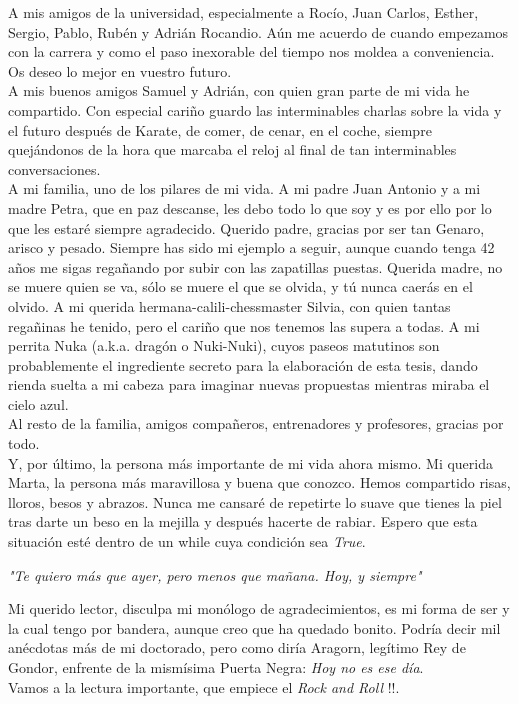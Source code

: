 A mis amigos de la universidad, especialmente a Rocío, Juan Carlos, Esther, Sergio, Pablo, Rubén y Adrián Rocandio. Aún me acuerdo de cuando empezamos con la carrera y como el paso inexorable del tiempo nos moldea a conveniencia. Os deseo lo mejor en vuestro futuro. \\

A mis buenos amigos Samuel y Adrián, con quien gran parte de mi vida he compartido. Con especial cariño guardo las interminables charlas sobre la vida y el futuro después de Karate, de comer, de cenar, en el coche, siempre quejándonos de la hora que marcaba el reloj al final de tan interminables conversaciones. \\

A mi familia, uno de los pilares de mi vida. A mi padre Juan Antonio y a mi madre Petra, que en paz descanse, les debo todo lo que soy y es por ello por lo que les estaré siempre agradecido. Querido padre, gracias por ser tan Genaro, arisco y pesado. Siempre has sido mi ejemplo a seguir, aunque cuando tenga 42 años me sigas regañando por subir con las zapatillas puestas. Querida madre, no se muere quien se va, sólo se muere el que se olvida, y tú nunca caerás en el olvido. A mi querida hermana-calili-chessmaster Silvia, con quien tantas regañinas he tenido, pero el cariño que nos tenemos las supera a todas. A mi perrita Nuka (a.k.a. dragón o Nuki-Nuki), cuyos paseos matutinos son probablemente el ingrediente secreto para la elaboración de esta tesis, dando rienda suelta a mi cabeza para imaginar nuevas propuestas mientras miraba el cielo azul. \\ 

Al resto de la familia, amigos compañeros, entrenadores y profesores, gracias por todo. \\

Y, por último, la persona más importante de mi vida ahora mismo. Mi querida Marta, la persona más maravillosa y buena que conozco. Hemos compartido risas, lloros, besos y abrazos. Nunca me cansaré de repetirte lo suave que tienes la piel tras darte un beso en la mejilla y después hacerte de rabiar. Espero que esta situación esté dentro de un while cuya condición sea \textit{True}. 

\begin{center}
\textit{"Te quiero más que ayer, pero menos que mañana. Hoy, y siempre"}
\end{center}

Mi querido lector, disculpa mi monólogo de agradecimientos, es mi forma de ser y la cual tengo por bandera, aunque creo que ha quedado bonito. Podría decir mil anécdotas más de mi doctorado, pero como diría Aragorn, legítimo Rey de Gondor, enfrente de la mismísima Puerta Negra: \textit{Hoy no es ese día}. \\

Vamos a la lectura importante, que empiece el \textit{Rock and Roll} !!.


